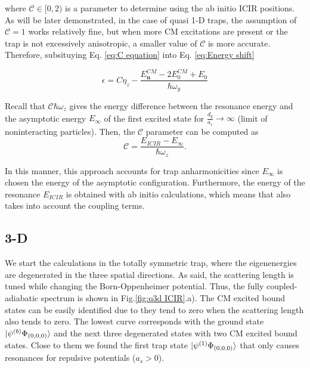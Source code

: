 \documentclass[aps,pre,twocolumn,superscriptaddress,showpacs]{revtex4-1}
\newcommand{\bfeq}[1]{{\boldsymbol{#1}}}
\begin{document}
where $\mathcal{C} \in [0, 2)$ is a parameter to determine using the ab initio ICIR positions. As will be later demonstrated, in the case of quasi 1-D traps, the assumption of $\mathcal{C}=1$
works relatively fine, but when more CM excitations are present or the trap is not excessively anisotropic, a smaller value of $\mathcal{C}$ is more accurate. Therefore, subsituying Eq. \ref{eq:C equation} into Eq. \ref{eq:Energy shift}

\begin{equation}
\epsilon = C\eta_z - \frac{E^{CM}_{\bfeq{n}} - 2E^{CM}_0 + E_0}{\hbar \omega_y}
\label{eq:final energy shift}
\end{equation}
	
Recall that $\mathcal{C} \hbar \omega_z$ gives the energy difference between the resonance energy and the asymptotic energy $E_{\infty}$ of the first excited state for $\frac{d_y}{a_s} \to \infty$
(limit of noninteracting particles). Then, the $\mathcal{C}$ parameter can be computed as
\begin{equation}
\mathcal{C} = \frac{E_{ICIR} - E_{\infty}}{\hbar \omega_z}.
\end{equation}
	
In this manner, this approach accounts for trap anharmonicities since $E_{\infty}$ is chosen the energy of the asymptotic configuration. Furthermore, the energy of the resonance $E_{ICIR}$ is 
obtained with ab initio calculations, which means that also takes into account the coupling terms.    

\subsection{3-D} \label{subsec:3D}
We start the calculations in the totally symmetric trap, where the eigenenergies are degenerated in the three spatial directions. As said, the scattering length is tuned while changing the Born-Oppenheimer potential. Thus, the fully coupled-adiabatic spectrum is shown in Fig.\ref{fig:q3d ICIR}.a). The CM excited bound states can be easily identified due to they tend to zero when the scattering length also tends to zero. The lowest curve corresponds with the ground state $\ket{ \psi^{(b)} \Phi_{(0,0,0)} }$ and the next three degenerated states with two CM excited bound states. Close to them we found the first trap state $\ket{ \psi^{(1)} \Phi_{(0,0,0)}} $ that only causes resonances for repulsive potentials ($a_s > 0$). 
\end{document}
